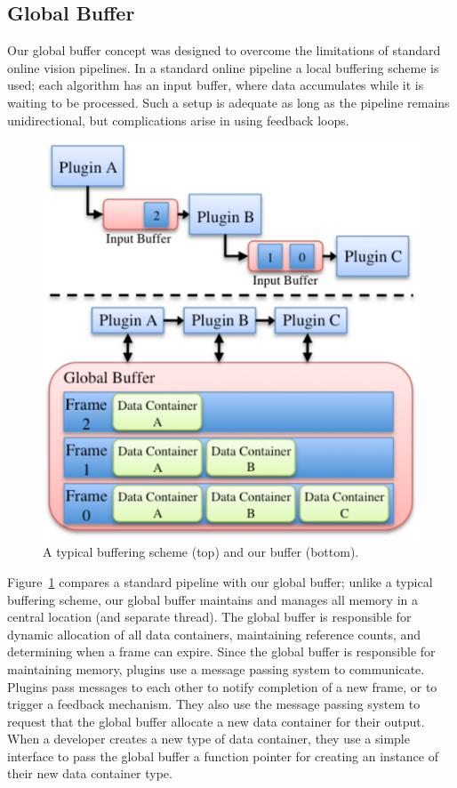 \subsection{Global Buffer}
Our global buffer concept was designed to overcome the limitations of standard online vision pipelines. In a standard online pipeline a local buffering scheme is used; each algorithm has an input buffer, where data accumulates while it is waiting to be processed. Such a setup is adequate as long as the  pipeline remains unidirectional, but complications arise in using feedback loops.
\begin{figure}[t]
\begin{center}
   \includegraphics[width=0.6\linewidth]{BufferComparaison.pdf}
\end{center}
   \caption[Comparison of Buffering Schemes]{A typical buffering scheme (top) and our buffer (bottom).}
\label{fig:BufferFig}
\end{figure}
Figure~\ref{fig:BufferFig} compares a standard pipeline with our global buffer; unlike a typical buffering scheme, our global buffer maintains and manages all memory in a central location (and separate thread). The global buffer is responsible for dynamic allocation of all data containers, maintaining reference counts, and determining when a frame can expire. Since the global buffer is responsible for maintaining memory, plugins use a message passing system to communicate. Plugins pass messages to each other to notify completion of a new frame, or to trigger a feedback mechanism. They also use the message passing system to request that the global buffer allocate a new data container for their output. When a developer creates a new type of data container, they use a simple interface to pass the global buffer a function pointer for creating an instance of their new data container type. 

